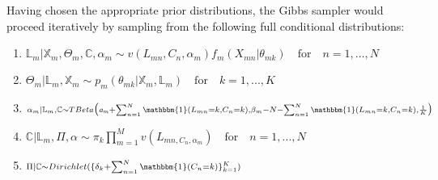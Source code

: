 Having chosen the appropriate prior distributions, the Gibbs sampler would proceed iteratively by sampling from the following full conditional distributions:

\begin{enumerate}
	\item $\scriptstyle \mathbb{L}_{m} | \mathbb{X}_{m}, \Theta_{m}, \mathbb{C}, \alpha_{m} \sim v(L_{mn}, C_{n}, \alpha_{m}) f_{m}(X_{mn}|\theta_{mk}) \quad \text{for} \quad n=1,...,N $
	\item $\scriptstyle \Theta_{m}|\mathbb{L}_{m}, \mathbb{X}_{m} \sim p_{m}(\theta_{mk}|\mathbb{X}_{m}, \mathbb{L}_{m}) \quad \text{for} \quad k=1,...,K $
	\item $\scriptstyle \alpha_{m}|\mathbb{L}_{m}, \mathbb{C} \sim TBeta \big(\mathit{a_{m}}+\sum_{n=1}^{N}\mathbbm{1}(L_{mn}=k,C_{n}=k), \beta_{m}-N-\sum_{n=1}^{N}\mathbbm{1}(L_{mn}=k,C_{n}=k), \frac{1}{K}\big)$
	\item $\scriptstyle \mathbb{C}|\mathbb{L}_{m}, \Pi, \alpha \sim \pi_{k}\prod_{m=1}^{M}v(L_{mn, C_{n}, \alpha_{m}}) \quad \text{for} \quad n=1,...,N$
	\item $\scriptstyle \Pi|\mathbb{C} \sim Dirichlet(\{ \delta_{k} + \sum_{n=1}^{N}\mathbbm{1}(C_{n}=k)\}_{k=1}^{K })$
\end{enumerate}